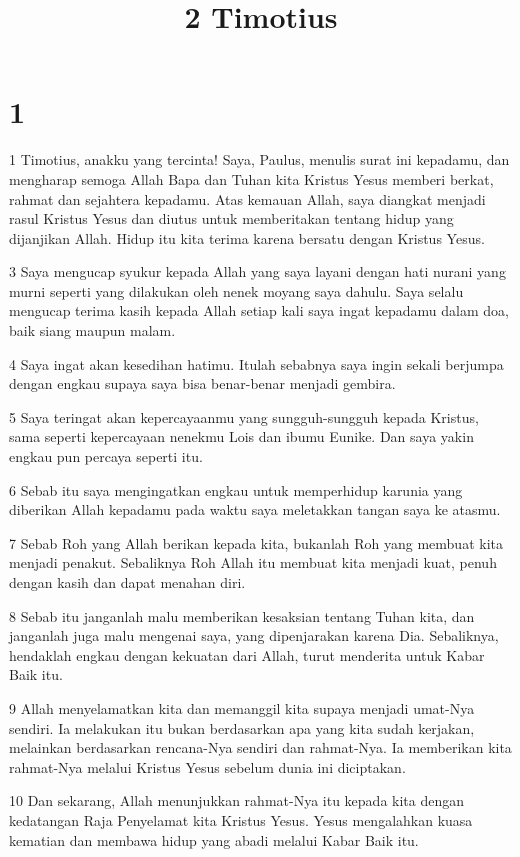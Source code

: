 

\title{2 Timotius}

\chapter{1}

\par 1 Timotius, anakku yang tercinta! Saya, Paulus, menulis surat ini kepadamu, dan mengharap semoga Allah Bapa dan Tuhan kita Kristus Yesus memberi berkat, rahmat dan sejahtera kepadamu. Atas kemauan Allah, saya diangkat menjadi rasul Kristus Yesus dan diutus untuk memberitakan tentang hidup yang dijanjikan Allah. Hidup itu kita terima karena bersatu dengan Kristus Yesus.
\par 3 Saya mengucap syukur kepada Allah yang saya layani dengan hati nurani yang murni seperti yang dilakukan oleh nenek moyang saya dahulu. Saya selalu mengucap terima kasih kepada Allah setiap kali saya ingat kepadamu dalam doa, baik siang maupun malam.
\par 4 Saya ingat akan kesedihan hatimu. Itulah sebabnya saya ingin sekali berjumpa dengan engkau supaya saya bisa benar-benar menjadi gembira.
\par 5 Saya teringat akan kepercayaanmu yang sungguh-sungguh kepada Kristus, sama seperti kepercayaan nenekmu Lois dan ibumu Eunike. Dan saya yakin engkau pun percaya seperti itu.
\par 6 Sebab itu saya mengingatkan engkau untuk memperhidup karunia yang diberikan Allah kepadamu pada waktu saya meletakkan tangan saya ke atasmu.
\par 7 Sebab Roh yang Allah berikan kepada kita, bukanlah Roh yang membuat kita menjadi penakut. Sebaliknya Roh Allah itu membuat kita menjadi kuat, penuh dengan kasih dan dapat menahan diri.
\par 8 Sebab itu janganlah malu memberikan kesaksian tentang Tuhan kita, dan janganlah juga malu mengenai saya, yang dipenjarakan karena Dia. Sebaliknya, hendaklah engkau dengan kekuatan dari Allah, turut menderita untuk Kabar Baik itu.
\par 9 Allah menyelamatkan kita dan memanggil kita supaya menjadi umat-Nya sendiri. Ia melakukan itu bukan berdasarkan apa yang kita sudah kerjakan, melainkan berdasarkan rencana-Nya sendiri dan rahmat-Nya. Ia memberikan kita rahmat-Nya melalui Kristus Yesus sebelum dunia ini diciptakan.
\par 10 Dan sekarang, Allah menunjukkan rahmat-Nya itu kepada kita dengan kedatangan Raja Penyelamat kita Kristus Yesus. Yesus mengalahkan kuasa kematian dan membawa hidup yang abadi melalui Kabar Baik itu.
